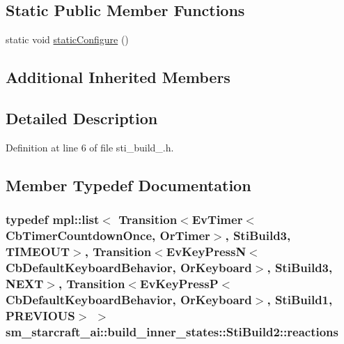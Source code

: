 \subsection*{Static Public Member Functions}
\begin{DoxyCompactItemize}
\item 
static void \hyperlink{structsm__starcraft__ai_1_1build__inner__states_1_1StiBuild2_a811f387766855eeba5679d7943ccdee1}{static\+Configure} ()
\end{DoxyCompactItemize}
\subsection*{Additional Inherited Members}


\subsection{Detailed Description}


Definition at line 6 of file sti\+\_\+build\+\_.\+h.



\subsection{Member Typedef Documentation}
\subsubsection[{\texorpdfstring{reactions}{reactions}}]{\setlength{\rightskip}{0pt plus 5cm}typedef mpl\+::list$<$ Transition$<$Ev\+Timer$<$Cb\+Timer\+Countdown\+Once, {\bf Or\+Timer}$>$, {\bf Sti\+Build3}, {\bf T\+I\+M\+E\+O\+UT}$>$, Transition$<$Ev\+Key\+PressN$<$Cb\+Default\+Keyboard\+Behavior, {\bf Or\+Keyboard}$>$, {\bf Sti\+Build3}, {\bf N\+E\+XT}$>$, Transition$<$Ev\+Key\+PressP$<$Cb\+Default\+Keyboard\+Behavior, {\bf Or\+Keyboard}$>$, {\bf Sti\+Build1}, {\bf P\+R\+E\+V\+I\+O\+US}$>$ $>$ {\bf sm\+\_\+starcraft\+\_\+ai\+::build\+\_\+inner\+\_\+states\+::\+Sti\+Build2\+::reactions}}\hypertarget{structsm__starcraft__ai_1_1build__inner__states_1_1StiBuild2_ab615bc2995682a7a80cdf4d5ddcad22c}{}\label{structsm__starcraft__ai_1_1build__inner__states_1_1StiBuild2_ab615bc2995682a7a80cdf4d5ddcad22c}


